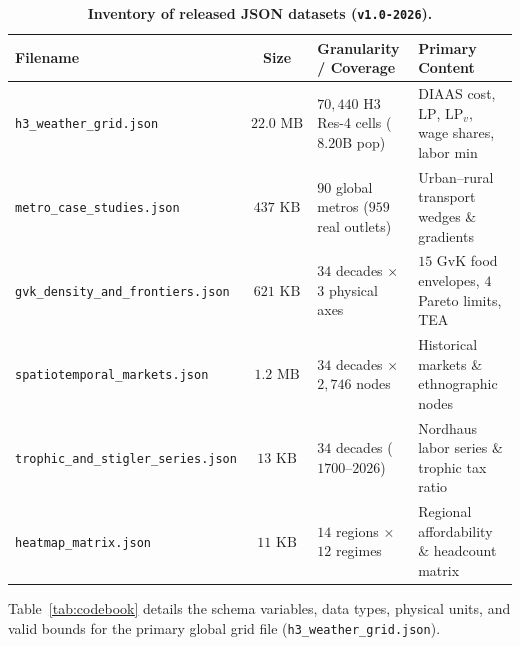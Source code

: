 \documentclass[11pt,a4paper]{article}
\begin{document}
\begin{table}[htbp]
\centering
\caption{\textbf{Inventory of released JSON datasets (\texttt{v1.0-2026}).}}
\label{tab:inventory}
\small
\begin{tabular}{lcll}
\toprule
\textbf{Filename} & \textbf{Size} & \textbf{Granularity / Coverage} & \textbf{Primary Content} \\
\midrule
\texttt{h3\_weather\_grid.json} & $22.0\text{ MB}$ & $70{,}440$ H3 Res-4 cells ($8.20\text{B}$ pop) & DIAAS cost, $\text{LP}$, $\text{LP}_v$, wage shares, labor min \\
\texttt{metro\_case\_studies.json} & $437\text{ KB}$ & $90$ global metros ($959$ real outlets) & Urban--rural transport wedges \& gradients \\
\texttt{gvk\_density\_and\_frontiers.json} & $621\text{ KB}$ & $34$ decades $\times$ $3$ physical axes & $15$ GvK food envelopes, $4$ Pareto limits, TEA \\
\texttt{spatiotemporal\_markets.json} & $1.2\text{ MB}$ & $34$ decades $\times$ $2{,}746$ nodes & Historical markets \& ethnographic nodes \\
\texttt{trophic\_and\_stigler\_series.json} & $13\text{ KB}$ & $34$ decades ($1700\text{--}2026$) & Nordhaus labor series \& trophic tax ratio \\
\texttt{heatmap\_matrix.json} & $11\text{ KB}$ & $14$ regions $\times$ $12$ regimes & Regional affordability \& headcount matrix \\
\bottomrule
\end{tabular}
\end{table}

Table~\ref{tab:codebook} details the schema variables, data types, physical units, and valid bounds for the primary global grid file (\texttt{h3\_weather\_grid.json}).
\end{document}

